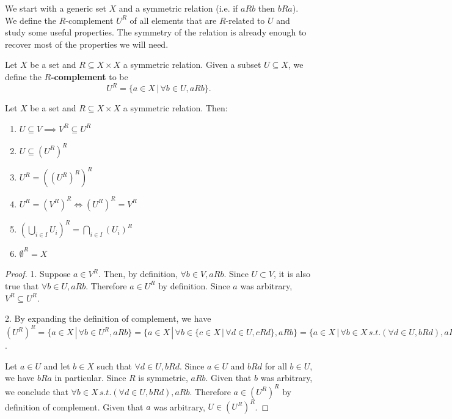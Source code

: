 We start with a generic set $X$ and a symmetric relation (i.e. if $aRb$ then $bRa$). We define the $R$-complement $U^R$ of all elements that are $R$-related to $U$ and study some useful properties. The symmetry of the relation is already enough to recover most of the properties we will need.

\begin{mathSection}
	\begin{defn}
		Let $X$ be a set and $R \subseteq X \times X$ a symmetric relation. Given a subset $U \subseteq X$, we define the \textbf{$R$-complement} to be
		$$ U^{R} = \{ a \in X \, | \, \forall b \in U, aRb  \}. $$
	\end{defn}
	
	\begin{prop}\label{pm_es_rComplProps}
		Let $X$ be a set and $R \subseteq X \times X$ a symmetric relation. Then:
		\begin{enumerate}
			\item $U \subseteq V \implies V^{R} \subseteq U^{R}$
			\item $U \subseteq (U^{R})^{R}$
			\item $U^{R} = ((U^{R})^{R})^{R}$
			\item $U^{R} = (V^{R})^{R} \iff (U^{R})^{R} = V^{R}$
			\item $(\bigcup_{i \in I} U_i )^{R} = \bigcap_{i \in I} (U_i)^{R}$
			\item $\emptyset^{R} = X$
		\end{enumerate}
	\end{prop}
	
	\begin{proof}
		1. Suppose $a \in V^{R}$. Then, by definition, $\forall b \in V, aRb$. Since $U \subset V$, it is also true that $\forall b \in U, aRb$. Therefore $a \in U^{R}$ by definition. Since $a$ was arbitrary, $V^{R} \subseteq U^{R}$.
		
		2. By expanding the definition of complement, we have $(U^{R})^{R}=\{ a \in X \, | \, \forall b \in U^{R}, aRb \} = \{ a \in X \, | \, \forall b \in \{ c \in X \, | \, \forall d \in U, cRd  \}, aRb \} = \{ a \in X \, | \, \forall b \in X \, s.t. (\forall d \in U, bRd), aRb \}$.
		
		Let $a \in U$ and let $b \in X$ such that $\forall d \in U, bRd$. Since $a \in U$ and $bRd$ for all $b \in U$, we have $bRa$ in particular. Since $R$ is symmetric, $aRb$. Given that $b$ was arbitrary, we conclude that $\forall b \in X \, s.t. (\forall d \in U, bRd), aRb$. Therefore $a \in (U^{R})^{R}$ by definition of complement. Given that $a$ was arbitrary, $U \in (U^{R})^{R}$.
		

\end{proof}
\end{mathSection}
